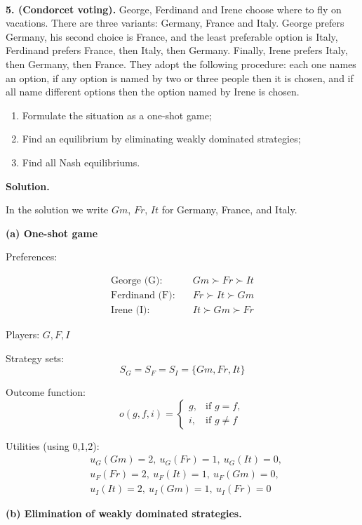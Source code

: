 \\
\textbf{5. (Condorcet voting).}
George, Ferdinand and Irene choose where to fly on vacations.
There are three variants: Germany, France and Italy.
George prefers Germany, his second choice is France, and the least preferable option is Italy,
Ferdinand prefers France, then Italy, then Germany.
Finally, Irene prefers Italy, then Germany, then France.
They adopt the following procedure: each one names an option, if any option is named by two or three people then it is chosen, and if all name different options then the option named by Irene is chosen.

\begin{enumerate}
\item[(a)] Formulate the situation as a one-shot game;
\item[(b)] Find an equilibrium by eliminating weakly dominated strategies;
\item[(c)] Find all Nash equilibriums.
\end{enumerate}

\textbf{Solution.}

In the solution we write $Gm$, $Fr$, $It$ for Germany, France, and Italy.

\textbf{(a) One-shot game}

Preferences:

\begin{align*}
\text{George (G):} &\quad Gm \succ Fr \succ It \\
\text{Ferdinand (F):} &\quad Fr \succ It \succ Gm \\
\text{Irene (I):} &\quad It \succ Gm \succ Fr
\end{align*}


Players: $G, F, I$

Strategy sets:
\[
S_G = S_F = S_I = \{Gm, Fr, It\}
\]

Outcome function:
\[
o(g,f,i)=
\begin{cases}
g, & \text{if } g=f,\\
i, & \text{if } g\neq f
\end{cases}
\]

Utilities (using 0,1,2):
\begin{align*}
&u_G(Gm)=2,\ u_G(Fr)=1,\ u_G(It)=0,\\
&u_F(Fr)=2,\ u_F(It)=1,\ u_F(Gm)=0,\\
&u_I(It)=2,\ u_I(Gm)=1,\ u_I(Fr)=0
\end{align*}

\textbf{(b) Elimination of weakly dominated strategies.}

